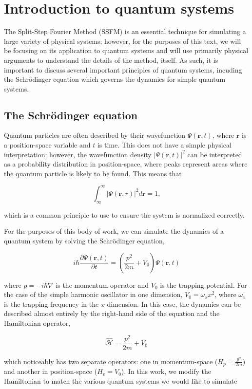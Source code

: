 \chapter*{Introduction to quantum systems}

The Split-Step Fourier Method (SSFM) is an essential technique for simulating a large variety of physical systems; however, for the purposes of this text, we will be focusing on its application to quantum systems and will use primarily physical arguments to understand the details of the method, itself.
As such, it is important to discuss several important principles of quantum systems, incuding the Schr\"odinger equation which governs the dynamics for simple quantum systems.

\section{The Schr\"odinger equation}
Quantum particles are often described by their wavefunction $\Psi(\mathbf{r},t)$, where $\mathbf{r}$ is a position-space variable and $t$ is time.
This does not have a simple physical interpretation; however, the wavefunction density $|\Psi(\mathbf{r},t)|^2$ can be interpreted as a probability distribution in position-space, where peaks represent areas where the quantum particle is likely to be found.
This means that

$$
\int_\infty^\infty |\Psi(\mathbf{r},r)|^2 d\mathbf{r} = 1,
$$

which is a common principle to use to ensure the system is normalized correctly.

For the purposes of this body of work, we can simulate the dynamics of a quantum system by solving the Schr\"odinger equation,

$$
i\hbar\frac{\partial\Psi(\mathbf{r},t)}{\partial t} = \left(\frac{p^2}{2m} + V_0\right) \Psi(\mathbf{r},t)
$$

where $p = -i\hbar\nabla$ is the momentum operator and $V_0$ is the trapping potential.
For the case of the simple harmonic oscillator in one dimension, $V_0 = \omega_x x^2$, where $\omega_x$ is the trapping frequency in the $x$-dimension.
In this case, the dynamics can be described almost entirely by the right-hand side of the equation and the Hamiltonian operator,

$$
\mathcal{\hat H} = \frac{p^2}{2m} + V_0
$$

which noticeably has two separate operators: one in momentum-space ($H_p = \frac{p^2}{2m}$) and another in position-space ($H_v = V_0$).
In this work, we modify the Hamiltonian to match the various quantum systems we would like to simulate

